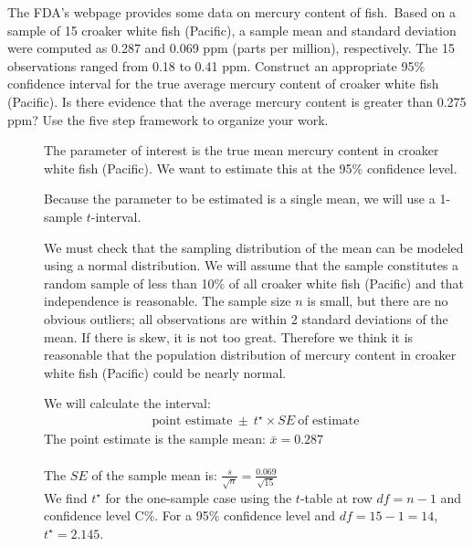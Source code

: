 \begin{examplewrap}
\begin{nexample}
{The FDA's webpage provides some data on mercury content of fish.\footnotemark\, Based on a sample of 15 croaker white fish (Pacific), a sample mean and standard deviation were computed as 0.287 and 0.069 ppm (parts per million), respectively. The 15 observations ranged from 0.18 to 0.41 ppm. Construct an appropriate 95\% confidence interval for the true average mercury content of croaker white fish (Pacific). Is there evidence that the average mercury content is greater than 0.275 ppm?  Use the five step framework to organize your work.  
}
\label{croakerWhiteFishPacificExerConditions}
\begin{description}
\item[] The parameter of interest is the true mean mercury content in croaker white fish (Pacific).  We want to estimate this at the 95\% confidence level.  
\item[] Because the parameter to be estimated is a single mean, we will use a 1-sample $t$-interval.
\item[] We must check that the sampling distribution of the mean can be modeled using a normal distribution.  We will assume that the sample constitutes a random sample of less than 10\% of all croaker white fish (Pacific) and that independence is reasonable. The sample size $n$ is small, but there are no obvious outliers; all observations are within 2 standard deviations of the mean. If there is skew, it is not too great. Therefore we think it is reasonable that the population distribution of mercury content in croaker white fish (Pacific) could be nearly normal.  
\item[]  We will calculate the interval:
\begin{align*}
\text{point estimate}\ \pm\ t^{\star} \times SE\ \text{of estimate}
\end{align*}
The point estimate is the sample mean: $\bar{x}= 0.287$\\
\\
The $SE$ of the sample mean is: $ \frac{s}{\sqrt{n}} = \frac{0.069}{\sqrt{15}}$ \\

We find $t^{\star}$ for the one-sample case using the $t$-table at row $df = n -1$ and confidence level C\%.  For a 95\% confidence level and $df = 15 - 1 = 14$, $t^{\star} = 2.145$.\\


\end{description}
\end{nexample}
\end{examplewrap}
